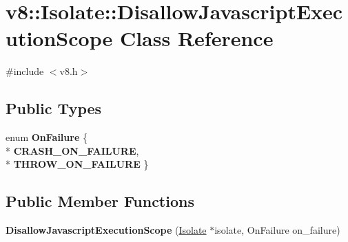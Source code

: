 \hypertarget{classv8_1_1_isolate_1_1_disallow_javascript_execution_scope}{}\section{v8\+:\+:Isolate\+:\+:Disallow\+Javascript\+Execution\+Scope Class Reference}
\label{classv8_1_1_isolate_1_1_disallow_javascript_execution_scope}


{\ttfamily \#include $<$v8.\+h$>$}

\subsection*{Public Types}
\begin{DoxyCompactItemize}
\item 
enum {\bfseries On\+Failure} \{ \\*
{\bfseries C\+R\+A\+S\+H\+\_\+\+O\+N\+\_\+\+F\+A\+I\+L\+U\+RE}, 
\\*
{\bfseries T\+H\+R\+O\+W\+\_\+\+O\+N\+\_\+\+F\+A\+I\+L\+U\+RE}
 \}\hypertarget{classv8_1_1_isolate_1_1_disallow_javascript_execution_scope_aeb586bef085fba34f97c09afd07ea843}{}\label{classv8_1_1_isolate_1_1_disallow_javascript_execution_scope_aeb586bef085fba34f97c09afd07ea843}

\end{DoxyCompactItemize}
\subsection*{Public Member Functions}
\begin{DoxyCompactItemize}
\item 
{\bfseries Disallow\+Javascript\+Execution\+Scope} (\hyperlink{classv8_1_1_isolate}{Isolate} $\ast$isolate, On\+Failure on\+\_\+failure)\hypertarget{classv8_1_1_isolate_1_1_disallow_javascript_execution_scope_a64813f7832ddca3014a7b98730a13948}{}\label{classv8_1_1_isolate_1_1_disallow_javascript_execution_scope_a64813f7832ddca3014a7b98730a13948}

\end{DoxyCompactItemize}
